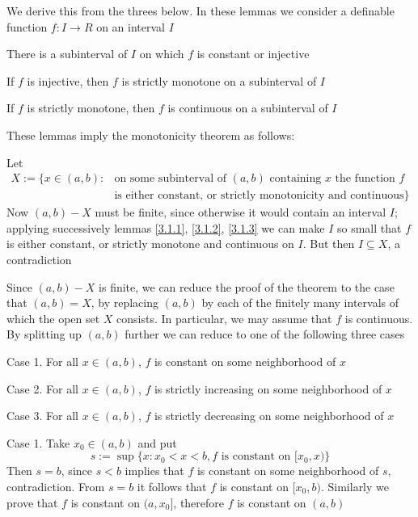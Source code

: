 \documentclass[11pt]{article}
\begin{document}
We derive this from the threes below. In these lemmas we consider a definable
function \(f:I\to R\) on an interval \(I\)
\begin{lemma}[]
\label{3.1.1}
There is a subinterval of \(I\) on which \(f\) is constant or injective
\end{lemma}

\begin{lemma}[]
\label{3.1.2}
If \(f\) is injective, then \(f\) is strictly monotone on a subinterval of \(I\)
\end{lemma}

\begin{lemma}[]
\label{3.1.3}
If \(f\) is strictly monotone, then \(f\) is continuous on a subinterval of \(I\)
\end{lemma}

These lemmas imply the monotonicity theorem as follows:

Let
\begin{align*}
X:=\{x\in(a,b):&\text{on some subinterval of $(a,b)$ containing $x$ the function $f$}\\
&\text{is either constant, or strictly monotonicity and continuous}\}
\end{align*}
Now \((a,b)-X\) must be finite, since otherwise it would contain an interval \(I\); applying
successively lemmas \ref{3.1.1}, \ref{3.1.2}, \ref{3.1.3} we can make \(I\) so small that \(f\) is
either constant, or strictly monotone and continuous on \(I\). But then \(I\subseteq X\), a
contradiction \label{Problem1}

Since \((a,b)-X\) is finite, we can reduce the proof of the theorem to the case
that \((a,b)=X\), by replacing \((a,b)\) by each of the finitely many intervals of which the
open set \(X\) consists. In particular, we may assume that \(f\) is continuous. By splitting
up \((a,b)\) further we can reduce to one of the following three cases

Case 1. For all \(x\in(a,b)\), \(f\) is constant on some neighborhood of \(x\)

Case 2. For all \(x\in(a,b)\), \(f\) is strictly increasing on some neighborhood of \(x\)

Case 3. For all \(x\in(a,b)\), \(f\) is strictly decreasing on some neighborhood of \(x\)

Case 1. Take \(x_0\in(a,b)\) and put
\begin{equation*}
s:=\sup\{x:x_0<x<b,f\text{ is constant on }[x_0,x)\}
\end{equation*}
Then \(s=b\), since \(s<b\) implies that \(f\) is constant on some neighborhood of \(s\),
contradiction. From \(s=b\) it follows that \(f\) is constant on \([x_0,b)\). Similarly we prove
that \(f\) is constant on \((a,x_0]\), therefore \(f\) is constant on \((a,b)\)
\end{document}
